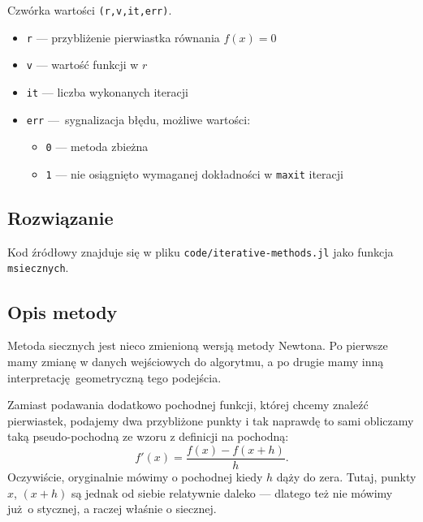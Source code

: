 \documentclass[10pt]{article}
\begin{document}
Czwórka wartości \texttt{(r,v,it,err)}.

\begin{itemize}
    \item \texttt{r} — przybliżenie pierwiastka równania $f(x) = 0$
    \item \texttt{v} — wartość funkcji w $r$
    \item \texttt{it} — liczba wykonanych iteracji
    \item \texttt{err} — sygnalizacja błędu, możliwe wartości:
    \begin{itemize}
        \item \texttt{0} — metoda zbieżna
        \item \texttt{1} — nie osiągnięto wymaganej dokładności w \texttt{maxit} iteracji
    \end{itemize}
\end{itemize}

\subsection{Rozwiązanie}

Kod źródłowy znajduje się w pliku \texttt{code/iterative-methods.jl} jako funkcja \texttt{msiecznych}.

\subsection{Opis metody}

Metoda siecznych jest nieco zmienioną wersją metody Newtona. Po pierwsze mamy zmianę w danych wejściowych do algorytmu, a po drugie mamy inną interpretację geometryczną tego podejścia.

Zamiast podawania dodatkowo pochodnej funkcji, której chcemy znaleźć pierwiastek, podajemy dwa przybliżone punkty i tak naprawdę to sami obliczamy taką pseudo-pochodną ze wzoru z definicji na pochodną:
$$
f'(x) = \frac{f(x) - f(x + h)}{h}.
$$
Oczywiście, oryginalnie mówimy o pochodnej kiedy $h$ dąży do zera. Tutaj, punkty $x$, $(x+h)$ są jednak od siebie relatywnie daleko — dlatego też nie mówimy już o stycznej, a raczej właśnie o siecznej.
\end{document}

